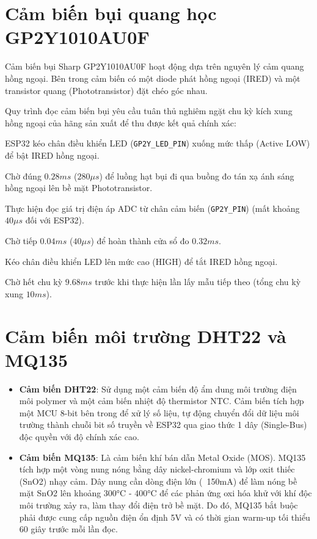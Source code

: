 \section{Cảm biến bụi quang học GP2Y1010AU0F}
Cảm biến bụi Sharp GP2Y1010AU0F hoạt động dựa trên nguyên lý cảm quang hồng ngoại. Bên trong cảm biến có một diode phát hồng ngoại (IRED) và một transistor quang (Phototransistor) đặt chéo góc nhau.

Quy trình đọc cảm biến bụi yêu cầu tuân thủ nghiêm ngặt chu kỳ kích xung hồng ngoại của hãng sản xuất để thu được kết quả chính xác:
\item ESP32 kéo chân điều khiển LED (\texttt{GP2Y\_LED\_PIN}) xuống mức thấp (Active LOW) để bật IRED hồng ngoại.
\item Chờ đúng \textbf{$0.28ms$} ($280\mu s$) để luồng hạt bụi đi qua buồng đo tán xạ ánh sáng hồng ngoại lên bề mặt Phototransistor.
\item Thực hiện đọc giá trị điện áp ADC từ chân cảm biến (\texttt{GP2Y\_PIN}) (mất khoảng $40\mu s$ đối với ESP32).
\item Chờ tiếp \textbf{$0.04ms$} ($40\mu s$) để hoàn thành cửa sổ đo $0.32ms$.
\item Kéo chân điều khiển LED lên mức cao (HIGH) để tắt IRED hồng ngoại.
\item Chờ hết chu kỳ \textbf{$9.68ms$} trước khi thực hiện lần lấy mẫu tiếp theo (tổng chu kỳ xung $10ms$).

\section{Cảm biến môi trường DHT22 và MQ135}
\begin{itemize}
    \item \textbf{Cảm biến DHT22}: Sử dụng một cảm biến độ ẩm dung môi trường điện môi polymer và một cảm biến nhiệt độ thermistor NTC. Cảm biến tích hợp một MCU 8-bit bên trong để xử lý số liệu, tự động chuyển đổi dữ liệu môi trường thành chuỗi bit số truyền về ESP32 qua giao thức 1 dây (Single-Bus) độc quyền với độ chính xác cao.
    \item \textbf{Cảm biến MQ135}: Là cảm biến khí bán dẫn Metal Oxide (MOS). MQ135 tích hợp một vòng nung nóng bằng dây nickel-chromium và lớp oxit thiếc (SnO2) nhạy cảm. Dây nung cần dòng điện lớn (~150mA) để làm nóng bề mặt SnO2 lên khoảng 300°C - 400°C để các phản ứng oxi hóa khử với khí độc môi trường xảy ra, làm thay đổi điện trở bề mặt. Do đó, MQ135 bắt buộc phải được cung cấp nguồn điện ổn định 5V và có thời gian warm-up tối thiểu 60 giây trước mỗi lần đọc.
\end{itemize}

